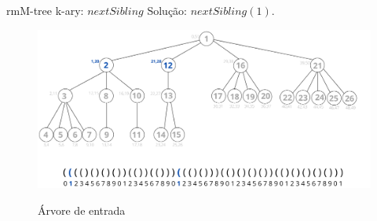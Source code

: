  \begin{frame}{rmM-tree k-ary: $nextSibling$}
    Solução:  $nextSibling(1)$.
     \begin{figure}[h!]
         \centering
         \includegraphics[scale=0.40]{images/nextSibling-res.png}\\
         \caption{Árvore de entrada}
     \end{figure} 
 \end{frame}